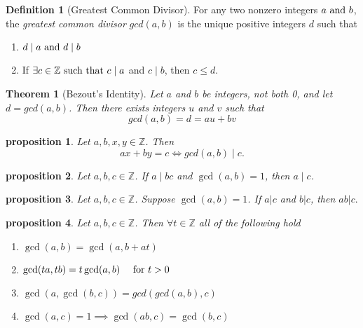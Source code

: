\documentclass{article}
\newtheorem{theorem}{Theorem}[section]
\newtheorem{proposition}{Proposition}[section]
\newtheorem{proposition}{proposition}[section]
\theoremstyle{definition}
\newtheorem{definition}{Definition}[section]
\theoremstyle{remark}
\begin{document}
\begin{definition}[Greatest Common Divisor]\label{def:gcd}
For any two nonzero integers \(a \textnormal{ and } b\), the \textit{greatest common divisor} \(gcd(a,b)\) is the unique positive integers \(d\) such that
\begin{enumerate}
\item \(d \mid a \textnormal{ and } d \mid b\)
\item If \( \exists c \in \mathbb{Z} \textnormal{ such that } c \mid a \) and \(c \mid b\), then \(c \leq d\).
\end{enumerate}

\end{definition}






\begin{theorem}[Bezout's Identity]\label{thm:bezout_identity}
Let \(a\) and \(b\) be integers, not both 0, and let \(d = gcd(a,b)\). Then there exists integers \(u\) and \(v\) such that \[
gcd(a,b) = d = au + bv
\]  
\end{theorem}



\begin{proposition}\label{prp:gcd_divides_lin_combo}
Let \(a,b,x,y \in \mathbb{Z}\). Then 
\[
ax + by = c \iff gcd(a,b) \mid c.
\]
\end{proposition}







\begin{proposition}\label{prp:coprime_divisor_of_product}
Let \(a,b,c \in \mathbb{Z}\). If \(a \mid bc \) and \(\gcd(a,b) = 1\), then \(a \mid c\).

\end{proposition}







\begin{proposition}
Let $ a,b,c \in \mathbb{Z}$. Suppose $ \gcd(a,b) = 1$. If $a|c$ and $b|c$, then $ab|c.$
\end{proposition}





\begin{proposition}
Let $ a,b,c \in \mathbb{Z}$. Then $ \forall t \in \mathbb{Z}$ all of the following hold
\begin{enumerate}
\item $\gcd(a,b) = \gcd(a,b + at)$
\item $\gcd(ta,tb) = t\gcd(a,b) \quad \textnormal{ for } t > 0$
\item $\gcd(a, \gcd(b,c)) = gcd(gcd(a,b), c)$
\item $\gcd(a,c) = 1 \implies \gcd(ab, c) = \gcd(b,c) $
\end{enumerate}

\end{proposition}
\end{document}
